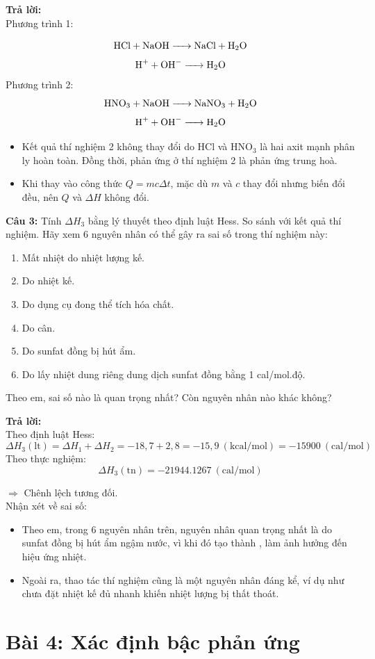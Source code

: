 \documentclass[12pt]{article}
\begin{document}
\textbf{Trả lời:} \\
Phương trình 1:

\[
\ce{HCl + NaOH -> NaCl + H2O}
\]
\[
\ce{H+  + OH^- -> H2O}
\]
Phương trình 2:
\[
\ce{HNO3 + NaOH -> NaNO3 + H2O}
\]
\[
\ce{H+ + OH^-  -> H2O}
\]
\begin{itemize}
    \item Kết quả thí nghiệm 2 không thay đổi do HCl và HNO$_3$ là hai axit mạnh phân ly hoàn toàn. Đồng thời, phản ứng ở thí nghiệm 2 là phản ứng trung hoà.
    \item Khi thay vào công thức $Q = mc\Delta t$, mặc dù $m$ và $c$ thay đổi nhưng biến đổi đều, nên $Q$ và $\Delta H$ không đổi.
\end{itemize}
\textbf{Câu 3:} Tính $\Delta H_3$ bằng lý thuyết theo định luật Hess. So sánh với kết quả thí nghiệm. Hãy xem 6 nguyên nhân có thể gây ra sai số trong thí nghiệm này:
\begin{enumerate}
    \item Mất nhiệt do nhiệt lượng kế.
    \item Do nhiệt kế.
    \item Do dụng cụ đong thể tích hóa chất.
    \item Do cân.
    \item Do sunfat đồng bị hút ẩm.
    \item Do lấy nhiệt dung riêng dung dịch sunfat đồng bằng 1 cal/mol.độ.
\end{enumerate}
Theo em, sai số nào là quan trọng nhất? Còn nguyên nhân nào khác không?


\textbf{Trả lời:} \\
Theo định luật Hess:
\[
\Delta H_3(\text{lt}) = \Delta H_1 + \Delta H_2 = -18{,}7 + 2{,}8 = -15{,}9 \ (\text{kcal/mol}) = -15900 \ (\text{cal/mol})
\]
Theo thực nghiệm:
\[
\Delta H_3(\text{tn}) = -21944.1267\ (\text{cal/mol})
\]

$\Rightarrow$ Chênh lệch tương đối. \\
Nhận xét về sai số:
\begin{itemize}
    \item Theo em, trong 6 nguyên nhân trên, nguyên nhân quan trọng nhất là do sunfat đồng bị hút ẩm ngậm nước, vì khi đó tạo thành , làm ảnh hưởng đến hiệu ứng nhiệt.
    \item Ngoài ra, thao tác thí nghiệm cũng là một nguyên nhân đáng kể, ví dụ như chưa đặt nhiệt kế đủ nhanh khiến nhiệt lượng bị thất thoát.
\end{itemize}
\section{Bài 4: Xác định bậc phản ứng}
\end{document}
